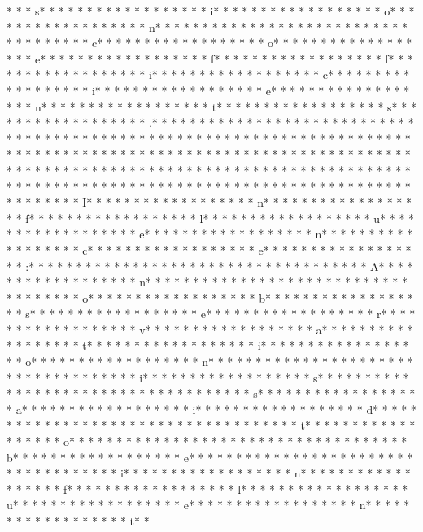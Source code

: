 * *  * s* * *  * * *  * * *  *  * * *  *  * * *  * i* * *  * * *  * * *  *  * * *  *  * * *  * o* * *  * * *  * * *  *  * * *  *  * * *  * n* * *  * * *  * * *  *  * * *  *  * * *  *  * * *  * * *  * * *  *  * * *  *  * * *  * c* * *  * * *  * * *  *  * * *  *  * * *  * o* * *  * * *  * * *  *  * * *  *  * * *  * e* * *  * * *  * * *  *  * * *  *  * * *  * f* * *  * * *  * * *  *  * * *  *  * * *  * f* * *  * * *  * * *  *  * * *  *  * * *  * i* * *  * * *  * * *  *  * * *  *  * * *  * c* * *  * * *  * * *  *  * * *  *  * * *  * i* * *  * * *  * * *  *  * * *  *  * * *  * e* * *  * * *  * * *  *  * * *  *  * * *  * n* * *  * * *  * * *  *  * * *  *  * * *  * t* * *  * * *  * * *  *  * * *  *  * * *  * s* * *  * * *  * * *  *  * * *  *  * * *  * .* * *  * * *  * * *  *  * * *  *  * * *  *  * * *  * * *  * * *  *  * * *  *  * * *  * 
* * *  * * *  * * *  *  * * *  *  * * *  * * *  * * *  *  * * *  *  * * *  * * *  * * *  *  * * *  *  * * *  *  * * *  * * *  * * *  *  * * *  *  * * *  *  * * *  * * *  * * *  *  * * *  *  * * *  *  * * *  * * *  * * *  *  * * *  *  * * *  *  * * *  * * *  * * *  *  * * *  *  * * *  *  * * *  * * *  * * *  *  * * *  *  * * *  *  * * *  * * *  * * *  *  * * *  *  * * *  *  * * *  * * *  * * *  *  * * *  *  * * *  * I* * *  * * *  * * *  *  * * *  *  * * *  * n* * *  * * *  * * *  *  * * *  *  * * *  * f* * *  * * *  * * *  *  * * *  *  * * *  * l* * *  * * *  * * *  *  * * *  *  * * *  * u* * *  * * *  * * *  *  * * *  *  * * *  * e* * *  * * *  * * *  *  * * *  *  * * *  * n* * *  * * *  * * *  *  * * *  *  * * *  * c* * *  * * *  * * *  *  * * *  *  * * *  * e* * *  * * *  * * *  *  * * *  *  * * *  * :* * *  * * *  * * *  *  * * *  *  * * *  *  * * *  * * *  * * *  *  * * *  *  * * *  * A* * *  * * *  * * *  *  * * *  *  * * *  * n* * *  * * *  * * *  *  * * *  *  * * *  *  * * *  * * *  * * *  *  * * *  *  * * *  * o* * *  * * *  * * *  *  * * *  *  * * *  * b* * *  * * *  * * *  *  * * *  *  * * *  * s* * *  * * *  * * *  *  * * *  *  * * *  * e* * *  * * *  * * *  *  * * *  *  * * *  * r* * *  * * *  * * *  *  * * *  *  * * *  * v* * *  * * *  * * *  *  * * *  *  * * *  * a* * *  * * *  * * *  *  * * *  *  * * *  * t* * *  * * *  * * *  *  * * *  *  * * *  * i* * *  * * *  * * *  *  * * *  *  * * *  * o* * *  * * *  * * *  *  * * *  *  * * *  * n* * *  * * *  * * *  *  * * *  *  * * *  *  * * *  * * *  * * *  *  * * *  *  * * *  * i* * *  * * *  * * *  *  * * *  *  * * *  * s* * *  * * *  * * *  *  * * *  *  * * *  *  * * *  * * *  * * *  *  * * *  *  * * *  * s* * *  * * *  * * *  *  * * *  *  * * *  * a* * *  * * *  * * *  *  * * *  *  * * *  * i* * *  * * *  * * *  *  * * *  *  * * *  * d* * *  * * *  * * *  *  * * *  *  * * *  *  * * *  * * *  * * *  *  * * *  *  * * *  * t* * *  * * *  * * *  *  * * *  *  * * *  * o* * *  * * *  * * *  *  * * *  *  * * *  *  * * *  * * *  * * *  *  * * *  *  * * *  * b* * *  * * *  * * *  *  * * *  *  * * *  * e* * *  * * *  * * *  *  * * *  *  * * *  *  * * *  * * *  * * *  *  * * *  *  * * *  * i* * *  * * *  * * *  *  * * *  *  * * *  * n* * *  * * *  * * *  *  * * *  *  * * *  * f* * *  * * *  * * *  *  * * *  *  * * *  * l* * *  * * *  * * *  *  * * *  *  * * *  * u* * *  * * *  * * *  *  * * *  *  * * *  * e* * *  * * *  * * *  *  * * *  *  * * *  * n* * *  * * *  * * *  *  * * *  *  * * *  * t* * 